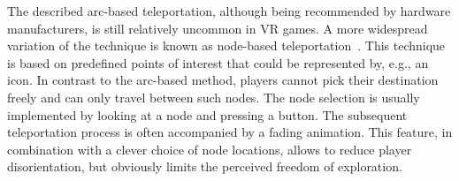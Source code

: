 

The described arc-based teleportation, although being recommended by hardware manufacturers, is still relatively uncommon in VR games. A more widespread variation of the technique is known as node-based teleportation~\cite{Habgood:2017:HLP:3130859.3131437}. This technique is based on predefined points of interest that could be represented by, e.g., an icon. In contrast to the arc-based method, players cannot pick their destination freely and can only travel between such nodes. The node selection is usually implemented by looking at a node and pressing a button. The subsequent teleportation process is often accompanied by a fading animation. This feature, in combination with a clever choice of node locations, allows to reduce player disorientation, but obviously limits the perceived freedom of exploration. 






